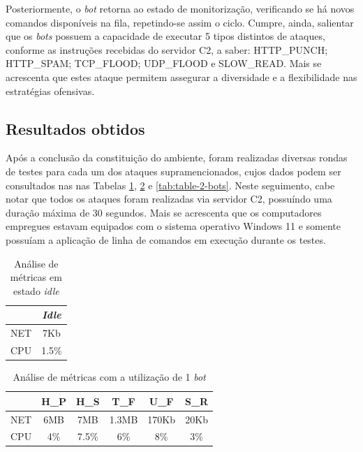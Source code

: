 Posteriormente, o \textit{bot} retorna ao estado de monitorização, verificando se há novos comandos disponíveis na fila, repetindo-se assim o ciclo. Cumpre, ainda, salientar que os \textit{bots} possuem a capacidade de executar 5 tipos distintos de ataques, conforme as instruções recebidas do servidor C2, a saber: HTTP\_PUNCH; HTTP\_SPAM; TCP\_FLOOD; UDP\_FLOOD e SLOW\_READ. Mais se acrescenta que estes ataque permitem assegurar a diversidade e a flexibilidade nas estratégias ofensivas.


\subsection{Resultados obtidos}
Após a conclusão da constituição do ambiente, foram realizadas diversas rondas de testes para cada um dos ataques supramencionados, cujos dados podem ser consultados nas nas Tabelas \ref{tab:table-idle}, \ref{tab:table-1-bot} e \ref{tab:table-2-bots}. Neste seguimento, cabe notar que todos os ataques foram realizadas via servidor C2, possuíndo uma duração máxima de 30 segundos. Mais se acrescenta que os computadores empregues estavam equipados com o sistema operativo Windows 11 e somente possuíam a aplicação de linha de comandos em execução durante os testes.


\renewcommand{\tablename}{Tabela}
\begin{table}[!h]
    \renewcommand{\arraystretch}{1.3}
    \caption{Análise de métricas em estado \textit{idle}}
    \label{tab:table-idle}
    \centering
    \begin{tabular}{|c|c|}
        \hline
            & \textit{Idle} \\
        \hline
        NET & 7Kb           \\
        \hline
        CPU & 1.5\%         \\
        \hline
    \end{tabular}
\end{table}


\begin{table}[!h]
    \renewcommand{\arraystretch}{1.3}
    \caption{Análise de métricas com a utilização de 1 \textit{bot}}
    \label{tab:table-1-bot}
    \centering
    \begin{tabular}{|c|c|c|c|c|c|}
        \hline
            & H\_P & H\_S  & T\_F  & U\_F  & S\_R \\
        \hline
        NET & 6MB  & 7MB   & 1.3MB & 170Kb & 20Kb \\
        \hline
        CPU & 4\%  & 7.5\% & 6\%   & 8\%   & 3\%  \\
        \hline
    \end{tabular}
\end{table}

